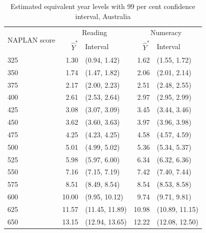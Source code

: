 \begin{table}[H]
\vspace{-10pt}
  \centering
  \caption{Estimated equivalent year levels with 99 per cent confidence interval, Australia}
  
      \begin{tabular}{lrlrl}

        \multirow{2}[4]{1.5cm}{NAPLAN score}  & \multicolumn{2}{c}{Reading} & \multicolumn{2}{c}{Numeracy} \\
    \cmidrule(lr){2-3} \cmidrule(lr){4-5}
      & $\widehat{Y}^{*}$ & \; Interval & $\widehat{Y}^{*}$ & \; Interval \\ \midrule
    325   & 1.30  & (0.94, 1.42) & 1.62  & (1.55, 1.72) \\
    350   & 1.74  & (1.47, 1.82) & 2.06  & (2.01, 2.14) \\
    375   & 2.17  & (2.00, 2.23) & 2.51  & (2.48, 2.55) \\
    400   & 2.61  & (2.53, 2.64) & 2.97  & (2.95, 2.99) \\
    425   & 3.08  & (3.07, 3.09) & 3.45  & (3.44, 3.46) \\
    450   & 3.62  & (3.60, 3.63) & 3.97  & (3.96, 3.98) \\
    475   & 4.25  & (4.23, 4.25) & 4.58  & (4.57, 4.59) \\
    500   & 5.01  & (4.99, 5.02) & 5.36  & (5.34, 5.37) \\
    525   & 5.98  & (5.97, 6.00) & 6.34  & (6.32, 6.36) \\
    550   & 7.16  & (7.15, 7.19) & 7.42  & (7.40, 7.44) \\
    575   & 8.51  & (8.49, 8.54) & 8.54  & (8.53, 8.58) \\
    600   & 10.00 & (9.95, 10.12) & 9.74  & (9.71, 9.81) \\
    625   & 11.57 & (11.45, 11.89) & 10.98 & (10.89, 11.15) \\
    650   & 13.15 & (12.94, 13.65) & 12.22 & (12.08, 12.50) \\
    \bottomrule
    \end{tabular}%
  \label{tab:cyl_ci}%
\begin{flushleft}

\end{flushleft}
\vspace{-6pt}
\end{table}%

